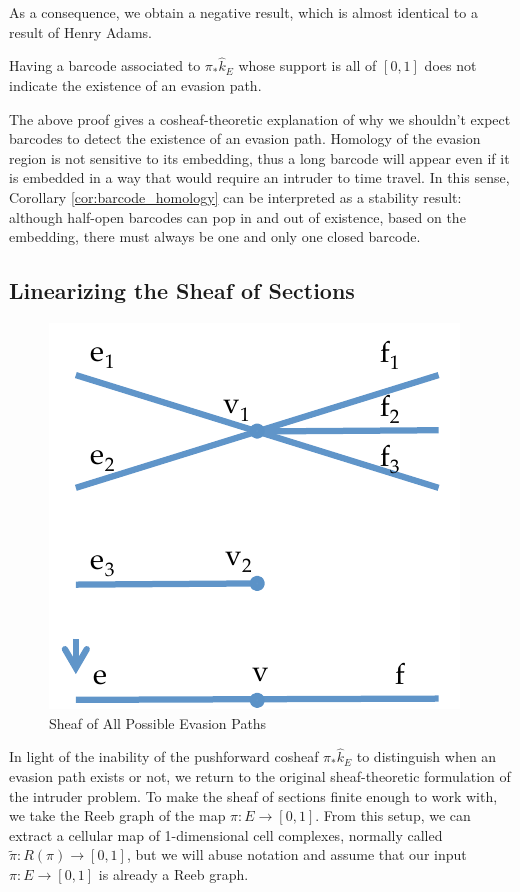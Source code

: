  As a consequence, we obtain a negative result, which is almost identical to a result of Henry Adams.

\begin{cor}
	Having a barcode associated to $\pi_*\hat{k}_E$ whose support is all of $[0,1]$ does not indicate the existence of an evasion path.
\end{cor}

\begin{rmk}
The above proof gives a cosheaf-theoretic explanation of why we shouldn't expect barcodes to detect the existence of an evasion path. Homology of the evasion region is not sensitive to its embedding, thus a long barcode will appear even if it is embedded in a way that would require an intruder to time travel. In this sense, Corollary \ref{cor:barcode_homology} can be interpreted as a stability result: although half-open barcodes can pop in and out of existence, based on the embedding, there must always be one and only one closed barcode.
\end{rmk}
  

\subsection{Linearizing the Sheaf of Sections}
\label{subsubsec:lss_bcs}

\begin{figure}[ht]
\begin{center}
\includegraphics[width=.5\textwidth]{route_stack_new.pdf}
\caption{Sheaf of All Possible Evasion Paths}
\label{fig:route_stack}
\end{center}
\end{figure}

In light of the inability of the pushforward cosheaf $\pi_*\hat{k}_E$ to distinguish when an evasion path exists or not, we return to the original sheaf-theoretic formulation of the intruder problem. To make the sheaf of sections finite enough to work with, we take the Reeb graph of the map $\pi:E\to[0,1]$. From this setup, we can extract a cellular map of 1-dimensional cell complexes, normally called $\tilde{\pi}:R(\pi)\to [0,1]$, but we will abuse notation and assume that our input $\pi: E\to [0,1]$ is already a Reeb graph.

